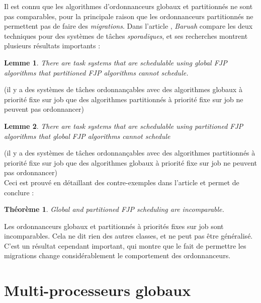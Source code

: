 \documentclass[11pt,a4paper,oneside]{report}
\newtheorem{mytheorem}{Théorème}
\newtheorem{mylemme}{Lemme}
\begin{document}

Il est connu que les algorithmes d'ordonnanceurs globaux et partitionnés ne sont pas comparables, 
pour la principale raison que les ordonnanceurs partitionnés ne permettent pas de faire des 
\textit{migrations}. Dans l'article \cite{baruah_techniques_2007}, \textit{Baruah} 
compare les deux techniques pour des systèmes de tâches \textit{sporadiques}, et 
ses recherches montrent plusieurs résultats importants :\\
\begin{mylemme}
	There are task systems that are schedulable using global FJP algorithms that partitioned FJP algorithms cannot schedule.
\end{mylemme}
(il y a des systèmes de tâches ordonnançables avec des algorithmes globaux à priorité fixe 
sur job que des algorithmes partitionnés à priorité fixe sur job ne peuvent pas ordonnancer)\\

\begin{mylemme}
	There are task systems that are schedulable using partitioned FJP algorithms that global FJP algorithms cannot schedule
\end{mylemme}
(il y a des systèmes de tâches ordonnançables avec des algorithmes partitionnés à priorité fixe 
	sur job que des algorithmes globaux à priorité fixe sur job ne peuvent pas ordonnancer)\\
Ceci est prouvé en détaillant des contre-exemples dans l'article et permet de conclure :\\
\begin{mytheorem}
	Global and partitioned FJP scheduling are incomparable.
\end{mytheorem}
Les ordonnanceurs globaux et partitionnés à priorités fixes sur job sont incomparables. 
Cela ne dit rien des autres classes, et ne peut pas être généralisé. C'est 
un résultat cependant important, qui montre que le fait de permettre les migrations 
change considérablement le comportement des ordonnanceurs.

\section{Multi-processeurs globaux}
\end{document}
